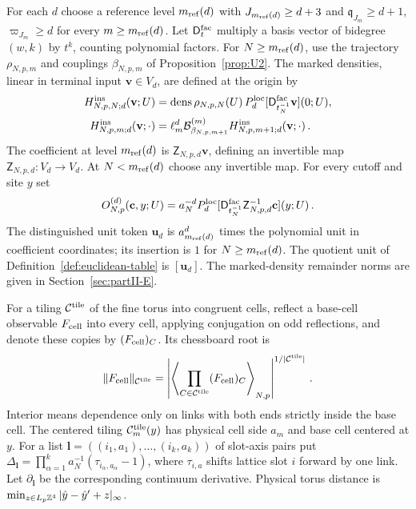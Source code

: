 \begin{definition}\label{def:insertions}
For each $d$ choose a reference level $m_{\mathrm{ref}}(d)$ with $J_{m_{\mathrm{ref}}(d)}\ge d+3$ and $\mathfrak q_{J_m}\ge d+1$, $\varpi_{J_m}\ge d$ for every $m\ge m_{\mathrm{ref}}(d)$. Let $\mathsf{D}^{\mathrm{fac}}_t$ multiply a basis vector of bidegree $(w,k)$ by $t^k$, counting polynomial factors. For $N\ge m_{\mathrm{ref}}(d)$, use the trajectory $\rho_{N,p,m}$ and couplings $\beta_{N,p,m}$ of Proposition~\ref{prop:U2}. The marked densities, linear in terminal input $\mathbf v\in V_d$, are defined at the origin by
\begin{align}\label{eq:marked-transfer}
H^{\rm ins}_{N,p,N;d}(\mathbf v;U)&=\operatorname{dens}\rho_{N,p,N}(U)\,P_{d}^{\mathrm{loc}}[\mathsf{D}^{\mathrm{fac}}_{t_N^{-1}}\mathbf v](0;U),\\
H^{\rm ins}_{N,p,m;d}(\mathbf v;\cdot)&=\ell_m^d\mathcal{B}^{(m)}_{\beta_{N,p,m+1}}H^{\rm ins}_{N,p,m+1;d}(\mathbf v;\cdot)\,.
\end{align}
The coefficient at level $m_{\mathrm{ref}}(d)$ is $\mathsf Z_{N,p,d}\mathbf v$, defining an invertible map $\mathsf Z_{N,p,d}:V_d\to V_d$. At $N<m_{\mathrm{ref}}(d)$ choose any invertible map. For every cutoff and site $y$ set
\begin{equation}\label{eq:renormalized-insertion}
O^{(d)}_{N,p}(\mathbf c,y;U)=a_N^{-d}P_{d}^{\mathrm{loc}}[\mathsf{D}^{\mathrm{fac}}_{t_N^{-1}}\mathsf Z_{N,p,d}^{-1}\mathbf c](y;U)\,.
\end{equation}
The distinguished unit token $\mathbf u_d$ is $a_{m_{\mathrm{ref}}(d)}^d$ times the polynomial unit in coefficient coordinates; its insertion is $1$ for $N\ge m_{\mathrm{ref}}(d)$. The quotient unit of Definition~\ref{def:euclidean-table} is $[\mathbf u_d]$. The marked-density remainder norms are given in Section~\ref{sec:partII-E}.
\end{definition}

\begin{definition}\label{def:chessboard}
For a tiling $\mathcal C^{\rm tile}$ of the fine torus into congruent cells, reflect a base-cell observable $F_{\rm cell}$ into every cell, applying conjugation on odd reflections, and denote these copies by $(F_{\rm cell})_C$. Its chessboard root is
\begin{equation}\label{eq:chessboard-root}
\|F_{\rm cell}\|_{\mathcal C^{\rm tile}}=\left|\left\langle\prod_{C\in\mathcal C^{\rm tile}}(F_{\rm cell})_C\right\rangle_{N,p}\right|^{1/|\mathcal C^{\rm tile}|}\,.
\end{equation}
Interior means dependence only on links with both ends strictly inside the base cell. The centered tiling $\mathcal C_m^{\rm tile}(y)$ has physical cell side $a_m$ and base cell centered at $y$. For a list $\boldsymbol l=((i_1,a_1),\ldots,(i_k,a_k))$ of slot-axis pairs put $\Delta_{\boldsymbol l}=\prod_{\alpha=1}^k a_N^{-1}(\tau_{i_\alpha,a_\alpha}-1)$, where $\tau_{i,a}$ shifts lattice slot $i$ forward by one link. Let $\partial_{\boldsymbol l}$ be the corresponding continuum derivative. Physical torus distance is $\min_{z\in L_p\mathbb{Z}^4}|\hat y-\hat y'+z|_\infty$.
\end{definition}

